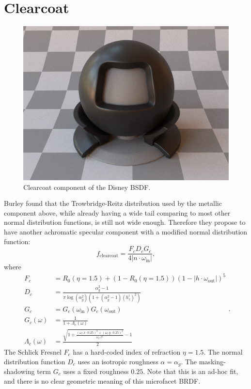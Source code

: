 \section{Clearcoat}
\begin{figure}
	\centering
	\includegraphics[width=0.5\linewidth]{imgs/disney_clearcoat.png}
	\caption{Clearcoat component of the Disney BSDF.}
\end{figure}

Burley found that the Trowbridge-Reitz distribution used by the metallic component above, while already having a wide tail comparing to most other normal distribution functions, is still not wide enough. Therefore they propose to have another achromatic specular component with a modified normal distribution function:
\begin{equation}
f_{\text{clearcoat}} = \frac{F_c D_c G_c}{4 |n \cdot \omega_{\text{in}}|},
\label{eq:f_clearcoat}
\end{equation}
where
\begin{equation}
\begin{aligned}
F_c &= R_0(\eta = 1.5) + (1 - R_0(\eta = 1.5)) \left(1 - |h \cdot \omega_{\text{out}}|\right)^5 \\
D_c &= \frac{\alpha_g^2 - 1}{\pi \log(\alpha_g^2) \left( 1 + (\alpha_g^2 - 1) \left(h^l_z\right)^2 \right)} \\
G_c &= G_{c}(\omega_{\text{in}}) G_{c}(\omega_{\text{out}}) \\
G_{c}(\omega) &= \frac{1}{1 + \Lambda_c(\omega)} \\
\Lambda_c(\omega) &= \frac{\sqrt{1 + \frac{\left(\omega_l.x \cdot 0.25\right)^2 + \left(\omega_l.y \cdot 0.25\right)^2}{\omega_l.z^2}} - 1}{2}
\end{aligned}.
\end{equation}
The Schlick Fresnel $F_c$ has a hard-coded index of refraction $\eta = 1.5$. The normal distribution function $D_c$ uses an isotropic roughness $\alpha = \alpha_g$. The masking-shadowing term $G_c$ uses a fixed roughness $0.25$. Note that this is an ad-hoc fit, and there is no clear geometric meaning of this microfacet BRDF.

